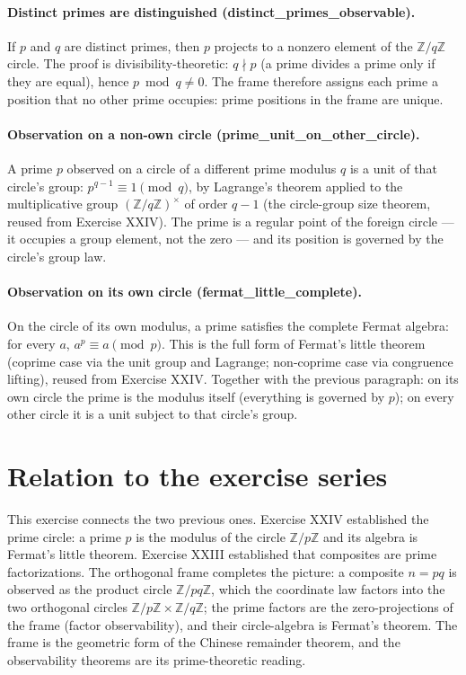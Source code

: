 \documentclass[sigplan,10pt,anonymous,review]{acmart}
\begin{document}
\paragraph{Distinct primes are distinguished (distinct\_primes\_observable).}
If $p$ and $q$ are distinct primes, then $p$ projects to a nonzero
element of the $\mathbb{Z}/q\mathbb{Z}$ circle. The proof is
divisibility-theoretic: $q \nmid p$ (a prime divides a prime only if
they are equal), hence $p \bmod q \ne 0$. The frame therefore assigns
each prime a position that no other prime occupies: prime positions in
the frame are unique.

\paragraph{Observation on a non-own circle (prime\_unit\_on\_other\_circle).}
A prime $p$ observed on a circle of a different prime modulus $q$ is a
unit of that circle's group: $p^{q-1} \equiv 1 \pmod q$, by Lagrange's
theorem applied to the multiplicative group
$(\mathbb{Z}/q\mathbb{Z})^\times$ of order $q-1$ (the circle-group size
theorem, reused from Exercise XXIV). The prime is a regular point of the
foreign circle --- it occupies a group element, not the zero --- and its
position is governed by the circle's group law.

\paragraph{Observation on its own circle (fermat\_little\_complete).}
On the circle of its own modulus, a prime satisfies the complete Fermat
algebra: for every $a$, $a^p \equiv a \pmod p$. This is the full form of
Fermat's little theorem (coprime case via the unit group and Lagrange;
non-coprime case via congruence lifting), reused from Exercise XXIV.
Together with the previous paragraph: on its own circle the prime is the
modulus itself (everything is governed by $p$); on every other circle it
is a unit subject to that circle's group.

\section{Relation to the exercise series}

This exercise connects the two previous ones. Exercise XXIV established
the prime circle: a prime $p$ is the modulus of the circle
$\mathbb{Z}/p\mathbb{Z}$ and its algebra is Fermat's little theorem.
Exercise XXIII established that composites are prime factorizations. The
orthogonal frame completes the picture: a composite $n = pq$ is observed
as the product circle $\mathbb{Z}/pq\mathbb{Z}$, which the coordinate law
factors into the two orthogonal circles $\mathbb{Z}/p\mathbb{Z} \times
\mathbb{Z}/q\mathbb{Z}$; the prime factors are the zero-projections of
the frame (factor observability), and their circle-algebra is Fermat's
theorem. The frame is the geometric form of the Chinese remainder
theorem, and the observability theorems are its prime-theoretic reading.
\end{document}
